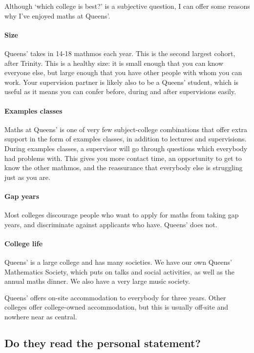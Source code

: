 \documentclass[a4paper]{article}
\begin{document}
Although `which college is best?' is a subjective question, I can offer some
reasons why I've enjoyed maths at Queens'. 

\paragraph{Size} Queens' takes in 14-18 mathmos each year. This is the second
largest cohort, after Trinity. This is a healthy size: it is small enough that
you can know everyone else, but large enough that you have other people with
whom you can work. Your supervision partner is likely also to be a Queens'
student, which is useful as it means you can confer before, during and after
supervisions easily. 

\paragraph{Examples classes} Maths at Queens' is one of very few subject-college
combinations that offer extra support in the form of examples classes, in
addition to lectures and supervisions. During examples classes, a supervisor
will go through questions which everybody had problems with. This gives you more
contact time, an opportunity to get to know the other mathmos, and the
reassurance that everybody else is struggling just as you are.

\paragraph{Gap years} Most colleges discourage people who want to apply for
maths from taking gap years, and discriminate against applicants who have.
Queens' does not. 

\paragraph{College life} Queens' is a large college and has many societies. We
have our own Queens' Mathematics Society, which puts on talks and social
activities, as well as the annual maths dinner. We also have a very large music
society. 

Queens' offers on-site accommodation to everybody for three years. Other
colleges offer college-owned accommodation, but this is usually off-site and
nowhere near as central.

\subsection{Do they read the personal statement?}
\end{document}
